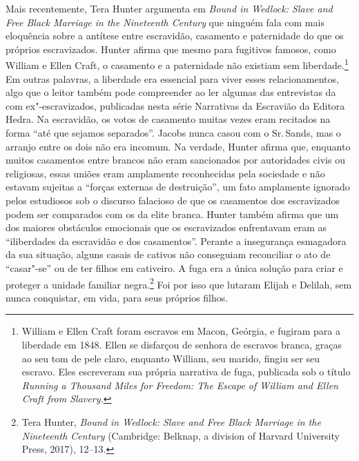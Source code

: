 Mais recentemente, Tera Hunter argumenta em \emph{Bound in Wedlock:
Slave and Free Black Marriage in the Nineteenth Century} que ninguém
fala com mais eloquência sobre a antítese entre escravidão, casamento e
paternidade do que os próprios escravizados. Hunter afirma que mesmo
para fugitivos famosos, como William e Ellen Craft, o casamento
e a paternidade não existiam sem liberdade.\footnote{William e Ellen Craft foram escravos em Macon, Geórgia, e fugiram
  para a liberdade em 1848. Ellen se disfarçou de senhora de escravos
  branca, graças ao seu tom de pele claro, enquanto William, seu marido,
  fingiu ser seu escravo. Eles escreveram sua própria narrativa de fuga,
  publicada sob o título \emph{Running a Thousand Miles for Freedom: The
  Escape of William and Ellen Craft from Slavery.}} Em outras palavras,
a liberdade era essencial para viver esses relacionamentos, algo que o
leitor também pode compreender ao ler algumas das entrevistas da  com
ex"-escravizados, publicadas nesta série Narrativas da Escravião da Editora
Hedra. Na escravidão, os votos de casamento muitas vezes eram recitados
na forma ``até que sejamos separados''. Jacobs nunca casou com o Sr.\,Sands, mas o arranjo entre os dois não era incomum. Na verdade, Hunter
afirma que, enquanto muitos casamentos entre brancos não eram
sancionados por autoridades civis ou religiosas, essas uniões eram
amplamente reconhecidas pela sociedade e não estavam sujeitas a ``forças
externas de destruição'', um fato amplamente ignorado pelos estudiosos
sob o discurso falacioso de que os casamentos dos escravizados podem
ser comparados com os da elite branca. Hunter também
afirma que um dos maiores obstáculos emocionais que os
escravizados enfrentavam eram as ``iliberdades da escravidão e dos casamentos''.
Perante a insegurança esmagadora da sua situação, alguns casais
de cativos não conseguiam reconciliar o ato de ``casar"-se'' ou de ter
filhos em cativeiro. A fuga era a única solução para criar e proteger a
unidade familiar negra.\footnote{Tera Hunter, \emph{Bound in Wedlock:
  Slave and Free Black Marriage in the Nineteenth Century} (Cambridge:
  Belknap, a division of Harvard University Press, 2017), 12--13.}%
  Foi por isso que lutaram Elijah e Delilah, sem nunca
conquistar, em vida, para seus próprios filhos.

